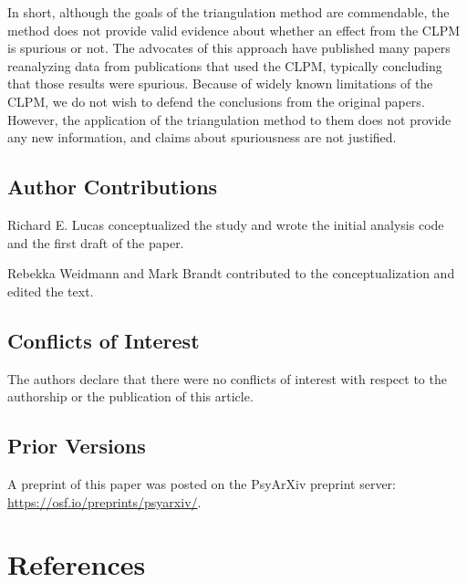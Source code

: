 \documentclass[
  man,floatsintext]{apa6}
\begin{document}
In short, although the goals of the triangulation method are commendable, the method does not provide valid evidence about whether an effect from the CLPM is spurious or not. The advocates of this approach have published many papers reanalyzing data from publications that used the CLPM, typically concluding that those results were spurious. Because of widely known limitations of the CLPM, we do not wish to defend the conclusions from the original papers. However, the application of the triangulation method to them does not provide any new information, and claims about spuriousness are not justified.

\subsection{Author Contributions}\label{author-contributions}

Richard E. Lucas conceptualized the study and wrote the initial analysis code and the first draft of the paper.

Rebekka Weidmann and Mark Brandt contributed to the conceptualization and edited the text.

\subsection{Conflicts of Interest}\label{conflicts-of-interest}

The authors declare that there were no conflicts of interest with respect to the authorship or the publication of this article.

\subsection{Prior Versions}\label{prior-versions}

A preprint of this paper was posted on the PsyArXiv preprint server: \url{https://osf.io/preprints/psyarxiv/}.

\newpage

\section*{References}\label{references}
\end{document}
